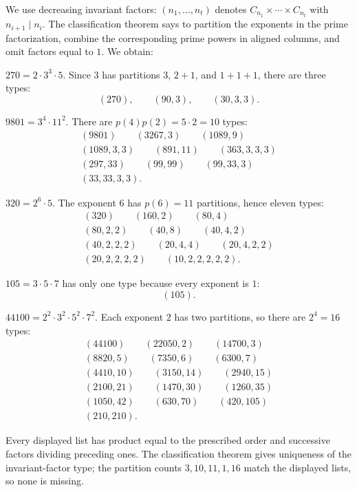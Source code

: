 \documentclass[11pt,oneside]{article}
\begin{document}
\begin{solution}
We use decreasing invariant factors: $(n_1,\ldots,n_t)$ denotes $C_{n_1}\times\cdots\times C_{n_t}$ with $n_{i+1}\mid n_i$. The classification theorem says to partition the exponents in the prime factorization, combine the corresponding prime powers in aligned columns, and omit factors equal to $1$. We obtain:
\begin{exercisesubparts}
\item $270=2\cdot3^3\cdot5$. Since $3$ has partitions $3$, $2+1$, and $1+1+1$, there are three types:
\[
(270),\qquad(90,3),\qquad(30,3,3).
\]
\item $9801=3^4\cdot11^2$. There are $p(4)p(2)=5\cdot2=10$ types:
\[
\begin{gathered}
(9801)\qquad(3267,3)\qquad(1089,9)\\
(1089,3,3)\qquad(891,11)\qquad(363,3,3,3)\\
(297,33)\qquad(99,99)\qquad(99,33,3)\\
(33,33,3,3).
\end{gathered}
\]
\item $320=2^6\cdot5$. The exponent $6$ has $p(6)=11$ partitions, hence eleven types:
\[
\begin{gathered}
(320)\qquad(160,2)\qquad(80,4)\\
(80,2,2)\qquad(40,8)\qquad(40,4,2)\\
(40,2,2,2)\qquad(20,4,4)\qquad(20,4,2,2)\\
(20,2,2,2,2)\qquad(10,2,2,2,2,2).
\end{gathered}
\]
\item $105=3\cdot5\cdot7$ has only one type because every exponent is $1$:
\[
 (105).
\]
\item $44100=2^2\cdot3^2\cdot5^2\cdot7^2$. Each exponent $2$ has two partitions, so there are $2^4=16$ types:
\[
\begin{gathered}
(44100)\qquad(22050,2)\qquad(14700,3)\\
(8820,5)\qquad(7350,6)\qquad(6300,7)\\
(4410,10)\qquad(3150,14)\qquad(2940,15)\\
(2100,21)\qquad(1470,30)\qquad(1260,35)\\
(1050,42)\qquad(630,70)\qquad(420,105)\\
(210,210).
\end{gathered}
\]
\end{exercisesubparts}
Every displayed list has product equal to the prescribed order and successive factors dividing preceding ones. The classification theorem gives uniqueness of the invariant-factor type; the partition counts $3,10,11,1,16$ match the displayed lists, so none is missing.
\end{solution}
\end{document}
